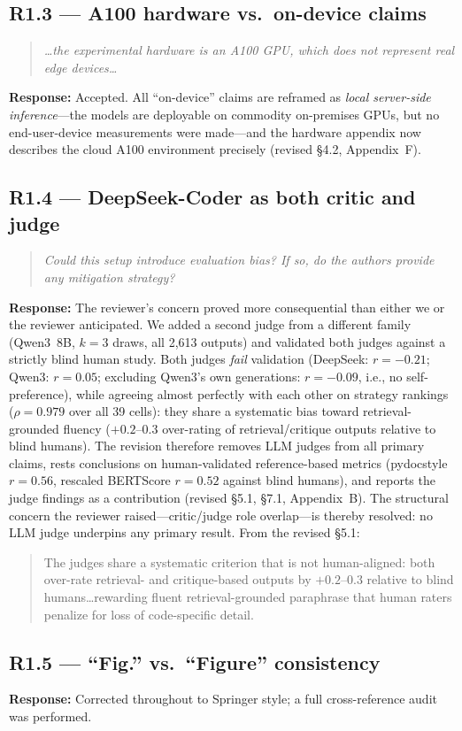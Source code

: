 \documentclass[11pt]{article}
\newcommand{\rcomment}[1]{\begin{quote}\itshape\color{black!70}#1\end{quote}}
\newcommand{\resp}{\noindent\textbf{Response:} }
\newcommand{\excerpt}[1]{\begin{quote}\small\color{blue!70!black}#1\end{quote}}
\begin{document}
\subsection*{R1.3 --- A100 hardware vs.\ on-device claims}
\rcomment{\dots the experimental hardware is an A100 GPU, which does not represent real edge devices\dots}
\resp Accepted. All ``on-device'' claims are reframed as \emph{local server-side inference}---the models are deployable on commodity on-premises GPUs, but no end-user-device measurements were made---and the hardware appendix now describes the cloud A100 environment precisely (revised \S4.2, Appendix~F).

\subsection*{R1.4 --- DeepSeek-Coder as both critic and judge}
\rcomment{Could this setup introduce evaluation bias? If so, do the authors provide any mitigation strategy?}
\resp The reviewer's concern proved more consequential than either we or the reviewer anticipated. We added a second judge from a different family (Qwen3~8B, $k{=}3$ draws, all 2{,}613 outputs) and validated both judges against a strictly blind human study. Both judges \emph{fail} validation (DeepSeek: $r=-0.21$; Qwen3: $r=0.05$; excluding Qwen3's own generations: $r=-0.09$, i.e., no self-preference), while agreeing almost perfectly with each other on strategy rankings ($\rho=0.979$ over all 39 cells): they share a systematic bias toward retrieval-grounded fluency ($+0.2$--$0.3$ over-rating of retrieval/critique outputs relative to blind humans). The revision therefore removes LLM judges from all primary claims, rests conclusions on human-validated reference-based metrics (pydocstyle $r=0.56$, rescaled BERTScore $r=0.52$ against blind humans), and reports the judge findings as a contribution (revised \S5.1, \S7.1, Appendix~B). The structural concern the reviewer raised---critic/judge role overlap---is thereby resolved: no LLM judge underpins any primary result. From the revised \S5.1:
\excerpt{The judges share a systematic criterion that is not human-aligned: both over-rate retrieval- and critique-based outputs by $+0.2$--$0.3$ relative to blind humans\ldots rewarding fluent retrieval-grounded paraphrase that human raters penalize for loss of code-specific detail.}

\subsection*{R1.5 --- ``Fig.'' vs.\ ``Figure'' consistency}
\resp Corrected throughout to Springer style; a full cross-reference audit was performed.
\end{document}
